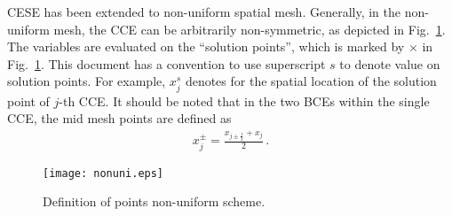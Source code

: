\documentclass[11pt,dvips]{article}
\renewcommand{\figurename}{Fig.}
\numberwithin{equation}{section}
\begin{document}
CESE has been extended to non-uniform spatial
mesh\cite{chang_multi-dimensional_2003}.  Generally, in the non-uniform mesh,
the CCE can be arbitrarily non-symmetric, as depicted in
\figurename~\ref{f:nonuni}.  The variables are evaluated on the ``solution
points'', which is marked by $\times$ in \figurename~\ref{f:nonuni}.  This
document has a convention to use superscript $s$ to denote value on solution
points.  For example, $x_j^s$ denotes for the spatial location of the solution
point of $j$-th CCE.  It should be noted that in the two BCEs within the single
CCE, the mid mesh points are defined as
\begin{align*}
  x_j^{\pm} = \frac{x_{j\pm\frac{1}{2}} + x_j}{2}\,.
\end{align*}

\begin{figure}[htbp]
  \centering
  \texttt{[image: nonuni.eps]}
  \caption{Definition of points non-uniform scheme.}
  \label{f:nonuni}
\end{figure}
\end{document}
